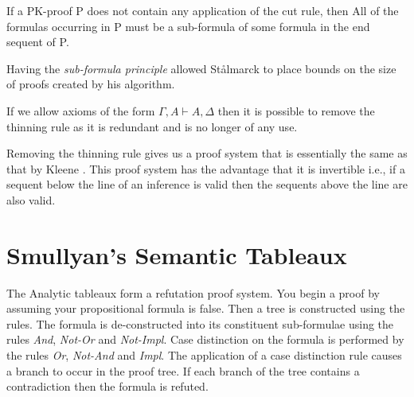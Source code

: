 \medskip

\begin{proposition}
If a PK-proof P does not contain any application of the cut rule, then
All of the formulas occurring in  P must be a sub-formula of some
formula in the end sequent of P.
\end{proposition}

\medskip

Having the \textit{sub-formula principle} allowed St{\aa}lmarck to place bounds on the
size of proofs created by his algorithm.

\medskip

\begin{proposition}
If we allow axioms of the form $\Gamma, A \vdash A, \Delta$ then it is
possible to remove the thinning rule as it is redundant and is no longer of
any use.

\end{proposition}

\medskip

Removing the thinning rule gives us a proof system that is essentially the
same as that by Kleene \cite{SK67}. This proof system has the advantage that it
is invertible i.e., if a sequent below the line of an inference is valid then
the sequents above the line are also valid.

\section{Smullyan's Semantic Tableaux}
The Analytic tableaux form a refutation proof system. You begin a proof by
assuming your propositional formula is false. Then a tree is constructed using
the rules. The formula is de-constructed into its constituent sub-formulae
using the rules \textit{And}, \textit{Not-Or} and \textit{Not-Impl}. Case
distinction on the formula is performed by the rules \textit{Or},
\textit{Not-And} and \textit{Impl}. The application of a case distinction rule
causes a branch to occur in the proof tree. If each branch of the tree contains a contradiction then the
formula is refuted.


